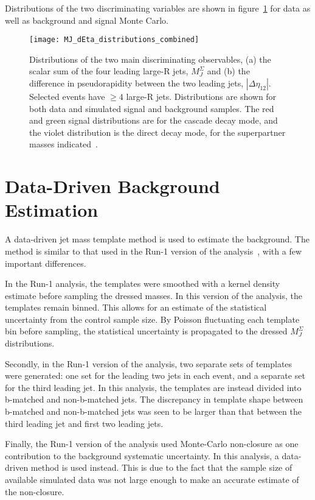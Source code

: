Distributions of the two discriminating variables are shown in figure~\ref{fig:MJ_dEta_distributions} for data as well as
background and signal Monte Carlo.

\begin{figure}[!ht]
    \texttt{[image: MJ\_dEta\_distributions\_combined]}
    \caption{Distributions of the two main discriminating observables, (a) the scalar sum of the four leading large-R jets, $M_{J}^{\Sigma}$ and (b) the difference in pseudorapidity between the two leading jets, $|\Delta\eta_{12}|$.
    Selected events have $\geq 4$ large-R jets.
    Distributions are shown for both data and simulated signal and background samples.
    The red and green signal distributions are for the cascade decay mode, and the violet distribution is the direct decay mode, for the superpartner masses indicated~\cite{paper-plb}.}
    \label{fig:MJ_dEta_distributions}
\end{figure}

\section{Data-Driven Background Estimation} \label{sec:bkg_estimation}
A data-driven jet mass template method is used to estimate the background.
The method is similar to that used in the Run-1 version of the analysis~\cite{run1-multijet}, with a few important differences.

In the Run-1 analysis, the templates were smoothed with a kernel density estimate before sampling the dressed masses.
In this version of the analysis, the templates remain binned.
This allows for an estimate of the statistical uncertainty from the control sample size.
By Poisson fluctuating each template bin before sampling, the statistical uncertainty is propagated to the dressed $M_J^{\Sigma}$ distributions.

Secondly, in the Run-1 version of the analysis, two separate sets of templates were generated: one set for the leading two jets in each event,
and a separate set for the third leading jet.
In this analysis, the templates are instead divided into b-matched and non-b-matched jets.
The discrepancy in template shape between b-matched and non-b-matched jets was seen to be larger than that between the third leading jet and first two leading jets.

Finally, the Run-1 version of the analysis used Monte-Carlo non-closure as one contribution to the background systematic uncertainty.
In this analysis, a data-driven method is used instead.
This is due to the fact that the sample size of available simulated data was not large enough to make an accurate estimate of the non-closure.

